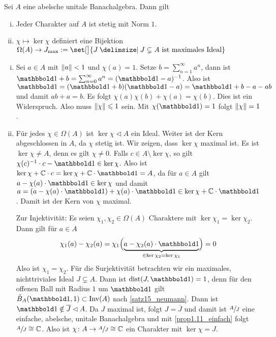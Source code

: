 \begin{satz}[label=satz:1.13,{name=[Stetigkeit von Charakteren, Zusammenhang mit maximalen Idealen]}]
	Sei $A$ eine abelsche unitale Banachalgebra. Dann gilt
	\begin{enumerate}[(i),itemsep=0pt]
		\item Jeder Charakter auf $A$ ist stetig mit Norm $1$.
		\item $\chi \mapsto \ker \chi$ definiert eine Bijektion  
		\(
			\Omega(A) \to J_{\max} := \set[\big]{J \given J \subsetneq A \text{ ist maximales Ideal} }
		\)
	\end{enumerate}
\end{satz}
\begin{beweis} \leavevmode
	\begin{enumerate}[(i)]
		\item Sei $a \in A$ mit $\Vert a\Vert<1$ und $\chi(a)=1$. 
		Setze $b= \sum_{n=1}^{\infty} a^n$, dann ist $\ind + b = \sum_{n=0}^{\infty} a^n = (\ind-a)^{-1}$. 
		Also ist $\ind = (\ind+b)(\ind-a) = \ind + b -a -ab$ und damit $ab+a=b$. 
		Es folgt $\chi(a)\chi(b) + \chi(a)= \chi(b)$. Dies ist ein Widerspruch. Also muss $\Vert\chi\Vert\leqslant 1$ sein. 
		Mit $\chi(\ind)=1$ folgt $\Vert\chi\Vert=1$. 
		\item Für jedes $\chi \in \Omega(A)$ ist $\ker \chi \lhd A$ ein Ideal. 
		Weiter ist der Kern abgeschlossen in $A$, da $\chi$ stetig ist. 
		Wir zeigen, dass $\ker \chi$ maximal ist. 
		Es ist $\ker \chi \not= A$, denn es gilt $\chi \not= 0$. 
		Falls $c \in A \setminus \ker \chi$, so gilt 
		\(
			\chi(c)^{-1} \cdot c-\ind \in \ker \chi
		\).
		Also ist $\ker \chi + \mathbb{C} \cdot c = \ker \chi + \mathbb{C} \cdot \ind=A$, da für $a \in A$ gilt $a- \chi(a) \cdot \ind \in \ker \chi$ und damit 
		$a= \enbrace*{a- \chi(a) \cdot \ind}+ \chi(a) \cdot \ind \in \ker \chi + \mathbb{C} \cdot \ind$. 
		Damit ist der Kern von $\chi$ maximal.
		
		Zur Injektivität: Es seien $\chi_1, \chi_2 \in \Omega(A)$ Charaktere mit $\ker \chi_1 = \ker \chi_2$. Dann gilt für $a \in A$
		\begin{align}
			\chi_1(a) - \chi_2(a) = \chi_1 \enbrace[\Big]{\Underbrace{a - \chi_2(a) \cdot \ind}{\in \ker \chi_2=\ker \chi_1}} = 0
		\end{align}
		Also ist $\chi_1=\chi_2$. Für die Surjektivität betrachten wir ein maximales, nichttriviales Ideal $J \subsetneq A$. 
		Dann ist $\dist \enbrace*{J,\ind}=1$, denn für den offenen Ball mit Radius $1$ um $\ind$ gilt $\mathring{B}_A(\ind,1) \subset \Inv(A)$ nach \autoref{satz15_neumann}. 
		Dann ist $\ind \notin \overline{J} \lhd A$. 
		Da $J$ maximal ist, folgt $J=\overline{J}$ und damit ist 
		$\sfrac{A}{J}$ eine einfache, abelsche, unitale Banachalgebra und mit \autoref{prop1.11_einfach} folgt $\sfrac{A}{J} \cong \mathbb{C}$. Also ist 
		$\chi \colon A \to \sfrac{A}{J} \cong \mathbb{C}$ ein Charakter mit $\ker \chi= J$. \qedhere
	\end{enumerate}
\end{beweis}

